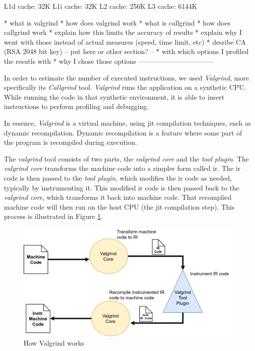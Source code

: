 \documentclass{llncs}
\begin{document}
L1d cache:           32K
L1i cache:           32K
L2 cache:            256K
L3 cache:            6144K

* what is valgrind
* how does valgrind work
* what is callgrind
* how does callgrind work
* explain how this limits the accuracy of results
* explain why I went with those instead of actual measures (speed, time limit, etc)
* desribe CA (RSA 2048 bit key)
-- put here or other section? --
* with which options I profiled the resutls with
* why I chose those options
---------------------------------

In order to estimate the number of executed instructions, we used \textit{Valgrind}, more specifically
    its \textit{Callgrind} tool. \textit{Valgrind} runs the application on a synthetic CPU. 
While running the code in that synthetic environment, it is able to insert instructions to perform
profiling and debugging. 

In essence, \textit{Valgrind} is a virtual machine, using \gls{jit}
compilation techniques, such as dynamic recompilation. Dynamic recompilation is a
feature where some part of the program is recompiled during execution.

The \textit{valgrind} tool consists of two parts, the \textit{valgrind core} and the \textit{tool
plugin}. The \textit{valgrind core} transforms the machine code into a simpler form called
\gls{ir}. The \gls{ir} code is then passed to the \textit{tool plugin}, which modifies the
\gls{ir} code as needed, typically by instrumenting it. This modified \gls{ir} code is then passed back to the 
\textit{valgrind core}, which transforms it back into machine code. That recomplied machine code  will then run on the
host CPU (the \gls{jit} compilation step). This process is illustrated in Figure \ref{fig:how_valgrind_works}.

\begin{figure}
  \centering
  \includegraphics[width=1.0\textwidth]{img/how_valgrind_works.png}
  \centering \caption{\label{fig:how_valgrind_works} How Valgrind works}
\end{figure}
\end{document}
